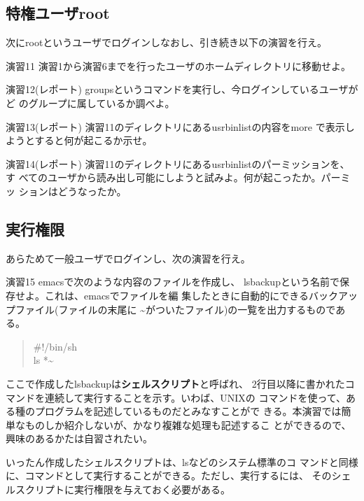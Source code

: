 \documentclass[a4j,10pt]{jarticle}
\begin{document}
\subsection{特権ユーザroot}
次にrootというユーザでログインしなおし、引き続き以下の演習を行え。
\begin{itembox}{演習11}
 演習1から演習6までを行ったユーザのホームディレクトリに移動せよ。
\end{itembox}
\begin{itembox}{演習12(レポート)}
 {\sffamily groups}というコマンドを実行し、今ログインしているユーザがど
 のグループに属しているか調べよ。
\end{itembox}
\begin{itembox}{演習13(レポート)}
 演習11のディレクトリにある{\sffamily usrbinlist}の内容を{\sffamily more} 
 で表示しようとすると何が起こるか示せ。
\end{itembox}
\begin{itembox}{演習14(レポート)}
 演習11のディレクトリにある{\sffamily usrbinlist}のパーミッションを、す
 べてのユーザから読み出し可能にしようと試みよ。何が起こったか。パーミッ
 ションはどうなったか。
\end{itembox}

\subsection{実行権限}
あらためて一般ユーザでログインし、次の演習を行え。
\begin{itembox}{演習15}
 {\sffamily emacs}で次のような内容のファイルを作成し、{\sffamily
 lsbackup}という名前で保存せよ。これは、{\sffamily emacs}でファイルを編
 集したときに自動的にできるバックアップファイル(ファイルの末尾に
 {\sffamily \~{}}がついたファイル)の一覧を出力するものである。
 \begin{quote}
  {\sffamily \#!/bin/sh}\\
  {\sffamily ls *\~{}}
 \end{quote}
\end{itembox}

ここで作成した{\sffamily lsbackup}は{\bfseries シェルスクリプト}と呼ばれ、
2行目以降に書かれたコマンドを連続して実行することを示す。いわば、UNIXの
コマンドを使って、ある種のプログラムを記述しているものだとみなすことがで
きる。本演習では簡単なものしか紹介しないが、かなり複雑な処理も記述するこ
とができるので、興味のあるかたは自習されたい。

いったん作成したシェルスクリプトは、{\sffamily ls}などのシステム標準のコ
マンドと同様に、コマンドとして実行することができる。ただし、実行するには、
そのシェルスクリプトに実行権限を与えておく必要がある。
\end{document}
